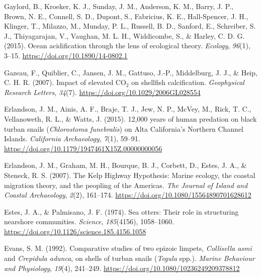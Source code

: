 \documentclass{CSUNthesis}
\begin{document}
\vspace{0.1em}

Gaylord, B., Kroeker, K. J., Sunday, J. M., Anderson, K. M., Barry, J. P., Brown, N. E., Connell, S. D., Dupont, S., Fabricius, K. E., Hall-Spencer, J. H., Klinger, T., Milazzo, M., Munday, P. L., Russell, B. D., Sanford, E., Schreiber, S. J., Thiyagarajan, V., Vaughan, M. L. H., Widdicombe, S., \& Harley, C. D. G. (2015). Ocean acidification through the lens of ecological theory. \textit{Ecology}, \textit{96}(1), 3--15. \url{https://doi.org/10.1890/14-0802.1}

\vspace{0.1em}

Gazeau, F., Quiblier, C., Jansen, J. M., Gattuso, J.-P., Middelburg, J. J., \& Heip, C. H. R. (2007). Impact of elevated CO\(_2\) on shellfish calcification. \textit{Geophysical Research Letters}, \textit{34}(7). \url{https://doi.org/10.1029/2006GL028554}

\vspace{0.1em}

Erlandson, J. M., Ainis, A. F., Braje, T. J., Jew, N. P., McVey, M., Rick, T. C., Vellanoweth, R. L., \& Watts, J. (2015). 12,000 years of human predation on black turban snails (\textit{Chlorostoma funebralis}) on Alta California's Northern Channel Islands. \textit{California Archaeology}, \textit{7}(1), 59--91. \url{https://doi.org/10.1179/1947461X15Z.00000000056}

\vspace{0.1em}

Erlandson, J. M., Graham, M. H., Bourque, B. J., Corbett, D., Estes, J. A., \& Steneck, R. S. (2007). The Kelp Highway Hypothesis: Marine ecology, the coastal migration theory, and the peopling of the Americas. \textit{The Journal of Island and Coastal Archaeology}, \textit{2}(2), 161--174. \url{https://doi.org/10.1080/15564890701628612}

\vspace{0.1em}

Estes, J. A., \& Palmisano, J. F. (1974). Sea otters: Their role in structuring nearshore communities. \textit{Science}, \textit{185}(4156), 1058--1060. \url{https://doi.org/10.1126/science.185.4156.1058}

\vspace{0.1em}

Evans, S. M. (1992). Comparative studies of two epizoic limpets, \textit{Collisella asmi} and \textit{Crepidula adunca}, on shells of turban snails (\textit{Tegula} spp.). \textit{Marine Behaviour and Physiology}, \textit{19}(4), 241--249. \url{https://doi.org/10.1080/10236249209378812}
\end{document}

